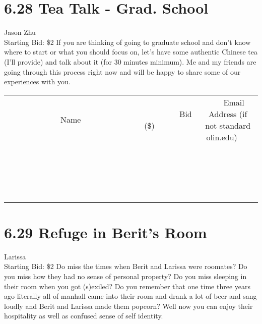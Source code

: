 \documentclass[11pt]{article}
\begin{document}
\section*{6.28 Tea Talk - Grad. School}
Jason Zhu
\\
Starting Bid: \$2
\newline
If you are thinking of going to graduate school and don't know where to start or what you should focus on, let's have some authentic Chinese tea (I'll provide) and talk about it (for 30 minutes minimum). Me and my friends are going through this process right now and will be happy to share some of our experiences with you.
\\[3ex]
\begin{tabular}{c c c}
~~~~~~~~~~~~~Name~~~~~~~~~~~~~ & ~~~~~~~~~Bid (\$)~~~~~~~~~  & ~~~Email Address (if not standard olin.edu)~~~\\
 & & \\
\hline
 & & \\
\hline
 & & \\
\hline
 & & \\
\hline
 & & \\
\hline
 & & \\
\hline
 & & \\
\hline
 & & \\
\hline
 & & \\
\hline
 & & \\
\hline
 & & \\
\hline
 & & \\
\hline
 & & \\
\hline
 & & \\
\hline
 & & \\
\hline
 & & \\
\hline
 & & \\
\hline
 & & \\
\hline
 & & \\
\hline
\end{tabular}
\newpage
\section*{6.29 Refuge in Berit's Room}
Larissa
\\
Starting Bid: \$2
\newline
Do miss the times when Berit and Larissa were roomates? Do you miss how they had no sense of personal property? Do you miss sleeping in their room when you got (s)exiled? Do you remember that one time three years ago literally all of manhall came into their room and drank a lot of beer and sang loudly and Berit and Larissa made them popcorn? 
Well now you can enjoy their hospitality as well as confused sense of self identity. 
\end{document}
